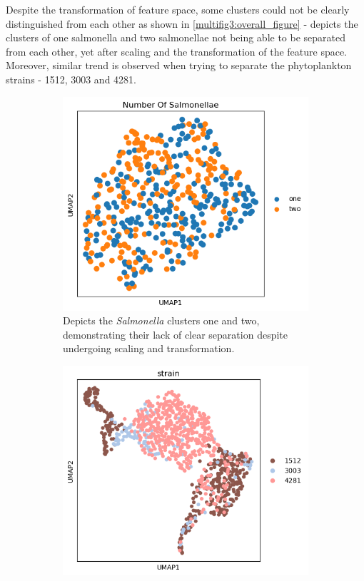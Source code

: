 \documentclass[12pt,a4paper]{article}
\begin{document}
Despite the transformation of feature space, some clusters could not be clearly distinguished from each other as shown in \ref{multifig3:overall_figure} - depicts the clusters of one salmonella and two salmonellae not being able to be separated from each other, yet after scaling and the transformation of the feature space. Moreover, similar trend is observed when trying to separate the phytoplankton strains - 1512, 3003 and 4281.

\begin{figure}
  \centering
  \begin{subfigure}{0.5\linewidth}
    \includegraphics[width=\linewidth]{Figures/clustersmixedafterscalingsalmonella.png}
    \caption{Depicts the \textit{Salmonella} clusters one and two, demonstrating their lack of clear separation despite undergoing scaling and transformation.}
    \label{multifig3:image_a}
  \end{subfigure}
  \hfill
  \begin{subfigure}{0.5\linewidth}
    \includegraphics[width=\linewidth]{Figures/clustersmixedafterscalingplankton.png}

\end{subfigure}
\end{figure}
\end{document}

